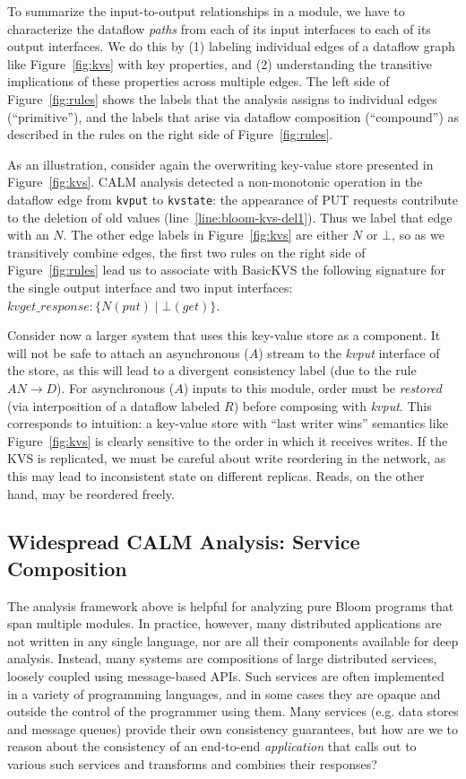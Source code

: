 To summarize the input-to-output relationships in a module, we have to characterize the dataflow \emph{paths} from each of its input interfaces to each of its output interfaces.  We do this by (1) labeling individual edges of a dataflow graph like Figure~\ref{fig:kvs} with key properties, and (2) understanding the transitive implications of these properties across multiple edges.  The left side of Figure~\ref{fig:rules} shows the labels that the analysis assigns to individual edges (``primitive''), and the labels that arise via dataflow composition (``compound'') as described in the rules on the right side of Figure~\ref{fig:rules}.  

As an illustration, consider again the overwriting key-value store presented in Figure~\ref{fig:kvs}.
CALM analysis detected a non-monotonic operation in the dataflow edge from \texttt{kvput} to \texttt{kvstate}: the appearance of PUT requests contribute to the deletion of old values (line~\ref{line:bloom-kvs-del1}).  Thus we label that edge with an $N$.  The other edge labels in Figure~\ref{fig:kvs} are either $N$ or $\bot$, so as we transitively combine edges, the first two rules on the right side of Figure~\ref{fig:rules} lead us to associate with BasicKVS the following signature for the single output interface and two input interfaces:
$kvget\_response: \{N(put) \; | \; \bot(get)\}$.  

Consider now a larger system that uses this key-value store as a component.  It will not be safe to attach an asynchronous ($A$)
stream to the \emph{kvput} interface of the store, as this will lead to a divergent consistency label
(due to the rule $AN \rightarrow D$).  For asynchronous ($A$) inputs to this module,
order must be \emph{restored} (via
interposition of a dataflow labeled $R$) 
before composing with \emph{kvput}.  This corresponds to intuition:
a key-value store with ``last writer wins'' semantics like Figure~\ref{fig:kvs} is clearly sensitive to the order in which it receives writes.
If the KVS is replicated, we must be careful about write reordering in the network, as this
may lead to inconsistent state on different replicas.
Reads, on the other hand, may be reordered freely.

\subsection{Widespread CALM Analysis: Service Composition}
The analysis framework above is helpful for analyzing pure Bloom programs that span multiple modules.
In practice, however, many distributed applications are not written in any single language, nor are all their components available for deep analysis.  Instead, many systems are compositions of large distributed services, loosely coupled using message-based APIs.
Such services are often implemented in a variety of programming 
languages, and in some cases they are opaque and outside the control of
the programmer using them.  
Many services (e.g. data stores and message queues) provide their own 
consistency guarantees, but how are we to reason about the consistency of an end-to-end
\emph{application} that calls out to various such services and transforms
and combines their responses?  

